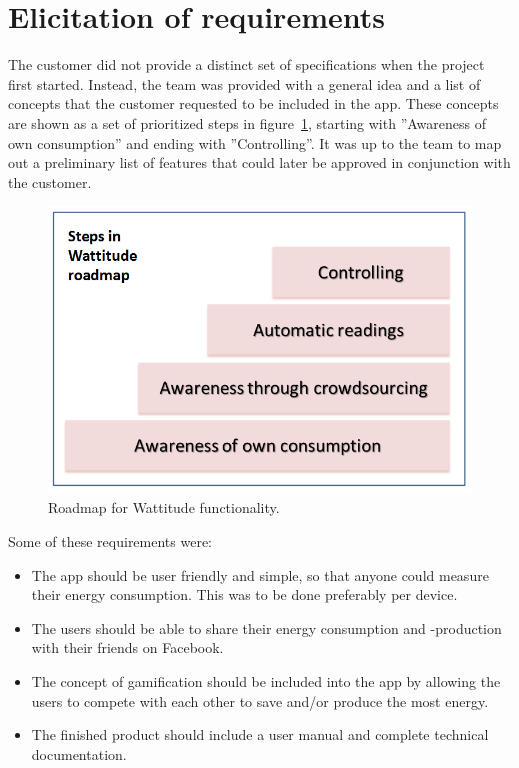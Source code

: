 \section{Elicitation of requirements}
\label{sec:obtainingreq}

The customer did not provide a distinct set of specifications when the project first started. Instead, the team was provided with a general idea and a list of concepts that the customer requested to be included in the app. These concepts are shown as a set of prioritized steps in figure~\ref{fig:roadmap}, starting with ''Awareness of own consumption'' and ending with ''Controlling''. It was up to the team to map out a preliminary list of features that could later be approved in conjunction with the customer.

\begin{figure}[H]
\centering
\includegraphics[height=0.35\textheight]{ch/specification/fig/roadmap.png}
\caption{Roadmap for Wattitude functionality.}
\label{fig:roadmap}
\end{figure}

Some of these requirements were:
\begin{itemize}
\item The app should be user friendly and simple, so that anyone could measure their energy consumption. This was to be done preferably per device. 
\item The users should be able to share their energy consumption and -production with their friends on Facebook. 
\item The concept of \gls{gamification} should be included into the app by allowing the users to compete with each other to save and/or produce the most energy. 
\item The finished product should include a user manual and complete technical documentation.
\end{itemize}

